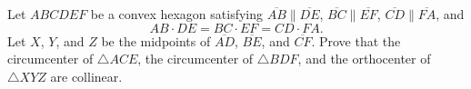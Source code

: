 Let $ABCDEF$ be a convex hexagon satisfying $\overline{AB} \parallel \overline{DE}$, $\overline{BC} \parallel \overline{EF}$, $\overline{CD} \parallel \overline{FA}$, and
\[
AB \cdot DE = BC \cdot EF = CD \cdot FA.
\]Let $X$, $Y$, and $Z$ be the midpoints of $\overline{AD}$, $\overline{BE}$, and $\overline{CF}$. Prove that the circumcenter of $\triangle ACE$, the circumcenter of $\triangle BDF$, and the orthocenter of $\triangle XYZ$ are collinear.